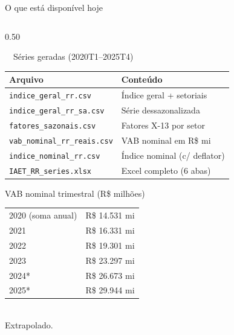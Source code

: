 \documentclass[aspectratio=169, 11pt]{beamer}
\begin{document}
\begin{frame}{O que está disponível hoje}

  \begin{columns}[T]
    \begin{column}{0.50\textwidth}
      \begin{block}{\faTable\ \ Séries geradas (2020T1--2025T4)}
        \renewcommand{\arraystretch}{1.2}
        \small
        \begin{tabular}{>{\raggedright}p{3.5cm} l}
          \textbf{Arquivo} & \textbf{Conteúdo} \\
          \hline
          \texttt{indice\_geral\_rr.csv} & Índice geral + setoriais \\
          \texttt{indice\_geral\_rr\_sa.csv} & Série dessazonalizada \\
          \texttt{fatores\_sazonais.csv} & Fatores X-13 por setor \\
          \texttt{vab\_nominal\_rr\_reais.csv} & VAB nominal em R\$ mi \\
          \texttt{indice\_nominal\_rr.csv} & Índice nominal (c/ deflator) \\
          \texttt{IAET\_RR\_series.xlsx} & Excel completo (6 abas) \\
        \end{tabular}
      \end{block}

      \vspace{0.3cm}

      \begin{exampleblock}{VAB nominal trimestral (R\$ milhões)}
        \small
        \begin{tabular}{lr}
          2020 (soma anual) & R\$ 14.531 mi \\
          2021 & R\$ 16.331 mi \\
          2022 & R\$ 19.301 mi \\
          2023 & R\$ 23.297 mi \\
          2024* & R\$ 26.673 mi \\
          2025* & R\$ 29.944 mi \\
        \end{tabular}\\
        {\tiny * Extrapolado.}
      \end{exampleblock}
    \end{column}


\end{columns}
\end{frame}
\end{document}
